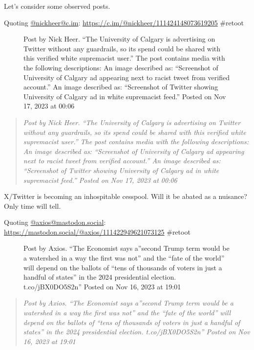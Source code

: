 Let's consider some observed posts.

Quoting \href{https://c.im/@nickheer/}{@nickheer@c.im}:
\url{https://c.im/@nickheer/111424148073619205} \#retoot

\begin{figure}
\centering
{}
\caption{Post by Nick Heer. ``The University of Calgary is advertising
on Twitter without any guardrails, so its spend could be shared with
this verified white supremacist user.'' The post contains media with the
following descriptions: An image described as: ``Screenshot of
University of Calgary ad appearing next to racist tweet from verified
account.'' An image described as: ``Screenshot of Twitter showing
University of Calgary ad in white supremacist feed.'' Posted on Nov 17,
2023 at 00:06}
\end{figure}

\begin{quote}
\emph{Post by Nick Heer. ``The University of Calgary is advertising on
Twitter without any guardrails, so its spend could be shared with this
verified white supremacist user.'' The post contains media with the
following descriptions: An image described as: ``Screenshot of
University of Calgary ad appearing next to racist tweet from verified
account.'' An image described as: ``Screenshot of Twitter showing
University of Calgary ad in white supremacist feed.'' Posted on Nov 17,
2023 at 00:06}
\end{quote}

X/Twitter is becoming an inhospitable cesspool. Will it be abated as a
nuisance? Only time will tell.

Quoting \href{https://mastodon.social/@axios/}{@axios@mastodon.social}:
\url{https://mastodon.social/@axios/111422949621073125} \#retoot

\begin{figure}
\centering
{}
\caption{Post by Axios. ``The Economist says a''second Trump term would
be a watershed in a way the first was not'' and the ``fate of the
world'' will depend on the ballots of ``tens of thousands of voters in
just a handful of states'' in the 2024 presidential election.
t.co/jBX0DO5S2n'' Posted on Nov 16, 2023 at 19:01}
\end{figure}

\begin{quote}
\emph{Post by Axios. ``The Economist says a''second Trump term would be
a watershed in a way the first was not'' and the ``fate of the world''
will depend on the ballots of ``tens of thousands of voters in just a
handful of states'' in the 2024 presidential election. t.co/jBX0DO5S2n''
Posted on Nov 16, 2023 at 19:01}
\end{quote}

